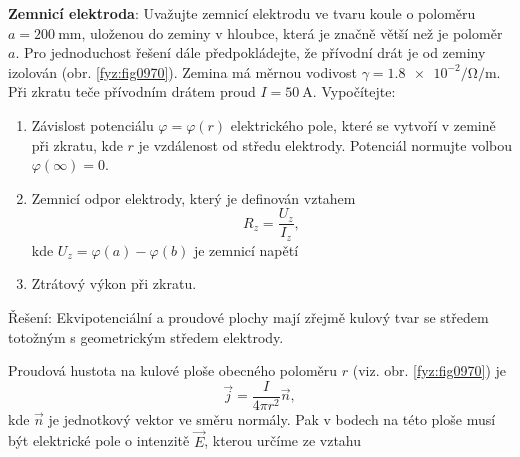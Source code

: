 \begin{mdframed}[style=mdexam]
  \begin{example}\label{TEO:exam011}
    \textbf{Zemnicí elektroda}: Uvažujte zemnicí elektrodu ve tvaru koule o poloměru
    $a=\qty{200}{\mm}$, uloženou do zeminy v hloubce, která je značně větší než je poloměr $a$. Pro
    jednoduchost řešení dále předpokládejte, že přívodní drát je od zeminy izolován (obr.
    \ref{fyz:fig0970}). Zemina má měrnou vodivost $\gamma=\num[exponent-product =
    \cdot]{1,8e-2}\unit{\per\ohm\per\m}$. Při zkratu teče přívodním drátem proud $I=\qty{50}{\A}$.
    Vypočítejte:




    \begin{enumerate}[label=\emph{\alph*}),noitemsep]
      \item Závislost potenciálu $\varphi=\varphi(r)$ elektrického pole, které se vytvoří v
            zemině při zkratu, kde $r$ je vzdálenost od středu elektrody. Potenciál normujte
            volbou $\varphi(\infty)=0$.
      \item Zemnicí odpor elektrody, který je definován vztahem
            $$R_z=\frac{U_z}{I_z},$$ kde $U_z = \varphi(a)-\varphi(b)$ je zemnicí napětí 
      \item Ztrátový výkon při zkratu.
    \end{enumerate}
    Řešení: Ekvipotenciální a proudové plochy mají zřejmě kulový tvar se středem totožným s
    geometrickým středem elektrody. 

    {\centering
    \captionsetup{type=figure}
    \label{fyz:fig0970}
    \par}


    Proudová hustota na kulové ploše obecného poloměru $r$ (viz. obr. \ref{fyz:fig0970}) je
    $$\vec{j}=\frac{I}{4\pi r^2}\vec{n},$$ kde $\vec{n}$ je jednotkový vektor ve směru normály. Pak
    v bodech na této ploše musí být elektrické pole o intenzitě $\vec{E}$, kterou určíme ze vztahu


\end{example}
\end{mdframed}
